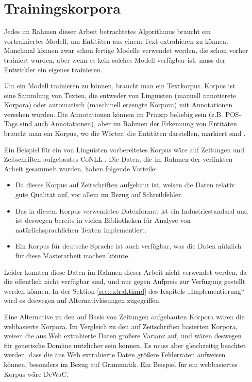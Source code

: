 \section{Trainingskorpora} \label{sec:trcorpora}
Jedes im Rahmen dieser Arbeit betrachtetes Algorithmus braucht ein vortrainiertes Modell, um Entitäten aus einem Text extrahieren zu können. Manchmal können zwar schon fertige Modelle verwendet werden, die schon vorher trainiert wurden, aber wenn es kein solches Modell verfügbar ist, muss der Entwickler ein eigenes trainieren.

Um ein Modell trainieren zu können, braucht man ein Textkorpus. Korpus ist eine Sammlung von Texten, die entweder von Linguisten (manuell annotierete Korpora) oder automatisch (maschinell erzeugte Korpora) mit Annotationen versehen wurden. Die Annotationen können im Prinzip beliebig sein (z.B. POS-Tags sind auch Annotationen), aber im Rahmen der Erkennung von Entitäten braucht man ein Korpus, wo die Wörter, die Entitäten darstellen, markiert sind \cite{naf2006korpuslinguistik}.

Ein Beispiel für ein von Linguisten vorbereitetes Korpus wäre auf Zeitungen und Zeitschriften aufgebautes CoNLL \cite{tjong2003introduction}. Die Daten, die im Rahmen der verlinkten Arbeit gesammelt wurden, haben folgende Vorteile:
\begin{itemize}
\item Da dieses Korpus auf Zeitschriften aufgebaut ist, weisen die Daten relativ gute Qualität auf, vor allem im Bezug auf Schreibfehler.
\item Das in diesem Korpus verwendetes Datenformat ist ein Industriestandard und ist deswegen bereits in vielen Bibliotheken für Analyse von natürlichsprachlichen Texten implementiert. 
\item Ein Korpus für deutsche Sprache ist auch verfügbar, was die Daten nützlich für diese Masterarbeit machen könnte.
\end{itemize}
Leider konnten diese Daten im Rahmen dieser Arbeit nicht verwendet werden, da die öffentlich nicht verfügbar sind, und nur gegen Aufpreis zur Verfügung gestellt werden können. In der Sektion \ref{sec:extraktimpl} des Kapitels ,,Implementierung`` wird es deswegen auf Alternativlösungen zugegriffen.

Eine Alternative zu den auf Basis von Zeitungen aufgebauten Korpora wären die webbasierte Korpora\cite{liu2006web}. Im Vergleich zu den auf Zeitschriften basierten Korpora, weisen die aus Web extrahierte Daten größere Varianz auf, und wären deswegen für generische Domäne nützlicher sein können. Es muss aber gleichzeitig beachtet werden, dass die aus Web extrahierte Daten größere Fehlerraten aufweisen können, besonders im Bezug auf Grammatik. Ein Beispiel für ein webbasiertes Korpus wäre DeWaC\cite{baroni2009wacky}.

